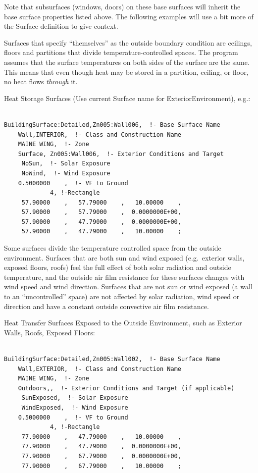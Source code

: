 Note that subsurfaces (windows, doors) on these base surfaces will inherit the base surface properties listed above. The following examples will use a bit more of the Surface definition to give context.

Surfaces that specify ``themselves'' as the outside boundary condition are ceilings, floors and partitions that divide temperature-controlled spaces. The program assumes that the surface temperatures on both sides of the surface are the same. This means that even though heat may be stored in a partition, ceiling, or floor, no heat flows \emph{through} it.

Heat Storage Surfaces (Use current Surface name for ExteriorEnvironment), e.g.:

\begin{lstlisting}

BuildingSurface:Detailed,Zn005:Wall006,  !- Base Surface Name
    Wall,INTERIOR,  !- Class and Construction Name
    MAINE WING,  !- Zone
    Surface, Zn005:Wall006,  !- Exterior Conditions and Target
     NoSun,  !- Solar Exposure
     NoWind,  !- Wind Exposure
    0.5000000    ,  !- VF to Ground
             4, !-Rectangle
     57.90000    ,   57.79000    ,   10.00000    ,
     57.90000    ,   57.79000    ,  0.0000000E+00,
     57.90000    ,   47.79000    ,  0.0000000E+00,
     57.90000    ,   47.79000    ,   10.00000    ;
\end{lstlisting}

Some surfaces divide the temperature controlled space from the outside environment. Surfaces that are both sun and wind exposed (e.g.~exterior walls, exposed floors, roofs) feel the full effect of both solar radiation and outside temperature, and the outside air film resistance for these surfaces changes with wind speed and wind direction. Surfaces that are not sun or wind exposed (a wall to an ``uncontrolled'' space) are not affected by solar radiation, wind speed or direction and have a constant outside convective air film resistance.

Heat Transfer Surfaces Exposed to the Outside Environment, such as Exterior Walls, Roofs, Exposed Floors:

\begin{lstlisting}

BuildingSurface:Detailed,Zn005:Wall002,  !- Base Surface Name
    Wall,EXTERIOR,  !- Class and Construction Name
    MAINE WING,  !- Zone
    Outdoors,,  !- Exterior Conditions and Target (if applicable)
     SunExposed,  !- Solar Exposure
     WindExposed,  !- Wind Exposure
    0.5000000    ,  !- VF to Ground
             4, !-Rectangle
     77.90000    ,   47.79000    ,   10.00000    ,
     77.90000    ,   47.79000    ,  0.0000000E+00,
     77.90000    ,   67.79000    ,  0.0000000E+00,
     77.90000    ,   67.79000    ,   10.00000    ;
\end{lstlisting}

